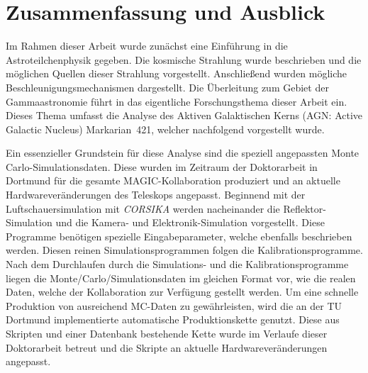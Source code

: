 \chapter{Zusammenfassung und Ausblick}
\label{chapter:Ergebnisse}
Im Rahmen dieser Arbeit wurde zunächst eine Einführung in die Astroteilchenphysik gegeben. 
Die kosmische Strahlung wurde beschrieben und die möglichen Quellen dieser Strahlung vorgestellt.
Anschließend wurden mögliche Beschleunigungsmechanismen dargestellt.
Die Überleitung zum Gebiet der Gammaastronomie führt in das eigentliche Forschungsthema dieser Arbeit ein.
Dieses Thema umfasst die Analyse des Aktiven Galaktischen Kerns (AGN: Active Galactic Nucleus) Markarian~421, welcher nachfolgend vorgestellt wurde.

Ein essenzieller Grundstein für diese Analyse sind die speziell angepassten Monte Carlo-Simulationsdaten.
Diese wurden im Zeitraum der Doktorarbeit in Dortmund für die gesamte MAGIC-Kollaboration produziert und an aktuelle Hardwareveränderungen des Teleskops angepasst.
Beginnend mit der Luftschauersimulation mit \textit{CORSIKA} werden nacheinander die Reflektor-Simulation und die Kamera- und Elektronik-Simulation vorgestellt.
Diese Programme benötigen spezielle Eingabeparameter, welche ebenfalls beschrieben werden.
Diesen reinen Simulationsprogrammen folgen die Kalibrationsprogramme. 
Nach dem Durchlaufen durch die Simulations- und die Kalibrationsprogramme liegen die Monte\-/Carlo\-/Simulationsdaten im gleichen Format vor, wie die realen Daten, welche der Kollaboration zur Verfügung gestellt werden.
Um eine schnelle Produktion von ausreichend MC-Daten zu gewährleisten, wird die an der TU Dortmund implementierte automatische Produktionskette genutzt.
Diese aus Skripten und einer Datenbank bestehende Kette wurde im Verlaufe dieser Doktorarbeit betreut und die Skripte an aktuelle Hardwareveränderungen angepasst.

